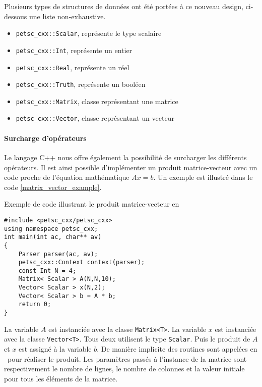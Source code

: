 Plusieurs types de structures de données ont été portées à ce nouveau design, ci-dessous une liste non-exhaustive.

\begin{itemize}
\item \verb#petsc_cxx::Scalar#, représente le type scalaire
\item \verb#petsc_cxx::Int#, représente un entier
\item \verb#petsc_cxx::Real#, représente un réel
\item \verb#petsc_cxx::Truth#, représente un booléen
\item \verb#petsc_cxx::Matrix#, classe représentant une matrice \petsc
\item \verb#petsc_cxx::Vector#, classe représentant un vecteur \petsc
\end{itemize}

\paragraph{Surcharge d'opérateurs}

Le langage C++ nous offre également la possibilité de surcharger les différents opérateurs. Il est ainsi possible d'implémenter un produit matrice-vecteur avec un code proche de l'équation mathématique $Ax = b$. Un exemple est illustré dans le code \ref{matrix_vector_example}.

\begin{algorithm}[h]
  \caption{Exemple de code illustrant le produit matrice-vecteur en \petscx}
  \label{matrix_vector_example}
\begin{verbatim}
#include <petsc_cxx/petsc_cxx>
using namespace petsc_cxx;
int main(int ac, char** av)
{
    Parser parser(ac, av);
    petsc_cxx::Context context(parser);
    const Int N = 4;
    Matrix< Scalar > A(N,N,10);
    Vector< Scalar > x(N,2);
    Vector< Scalar > b = A * b;
    return 0;
}
\end{verbatim}
\end{algorithm}

La variable $A$ est instanciée avec la classe \verb#Matrix<T>#. La variable $x$ est instanciée avec la classe \verb#Vector<T>#. Tous deux utilisent le type \verb#Scalar#. Puis le produit de $A$ et $x$ est assigné à la variable $b$. De manière implicite des routines sont appelées en \petsc\ pour réaliser le produit. Les paramètres passés à l'instance de la matrice sont respectivement le nombre de lignes, le nombre de colonnes et la valeur initiale pour tous les éléments de la matrice.
